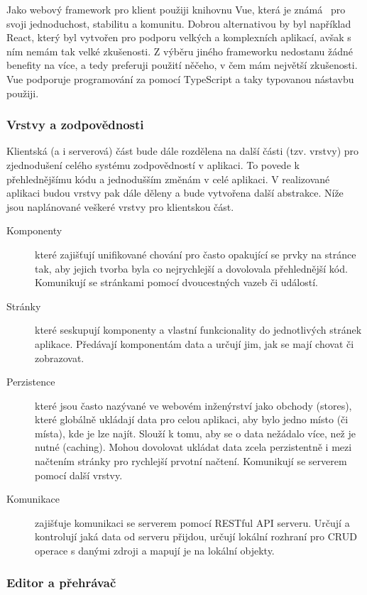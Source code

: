 Jako webový framework pro klient použiji knihovnu Vue, která je známá~\cite{potter_2023} pro svoji jednoduchost, stabilitu a komunitu.
Dobrou alternativou by byl například React, který byl vytvořen pro podporu velkých a komplexních aplikací, avšak s ním nemám tak velké zkušenosti.
Z výběru jiného frameworku nedostanu žádné benefity na více, a tedy preferuji použití něčeho, v čem mám největší zkušenosti.
Vue podporuje programování za pomocí TypeScript a taky typovanou nástavbu použiji.

\subsubsection{Vrstvy a zodpovědnosti}

Klientská (a i serverová) část bude dále rozdělena na další části (tzv. vrstvy) pro zjednodušení celého systému zodpovědností v aplikaci.
To povede k přehlednějšímu kódu a jednodušším změnám v celé aplikaci.
V realizované aplikaci budou vrstvy pak dále děleny a bude vytvořena další abstrakce.
Níže jsou naplánované veškeré vrstvy pro klientskou část.

\begin{description}
    \item[Komponenty] které zajišťují unifikované chování pro často opakující se prvky na stránce tak, aby jejich tvorba byla co nejrychlejší a dovolovala přehlednější kód. Komunikují se stránkami pomocí dvoucestných vazeb či událostí.
    \item[Stránky] které seskupují komponenty a vlastní funkcionality do jednotlivých stránek aplikace. Předávají komponentám data a určují jim, jak se mají chovat či zobrazovat.
    \item[Perzistence] které jsou často nazývané ve webovém inženýrství jako obchody (stores), které globálně ukládají data pro celou aplikaci, aby bylo jedno místo (či místa), kde je lze najít. Slouží k tomu, aby se o data nežádalo více, než je nutné (caching). Mohou dovolovat ukládat data zcela perzistentně i mezi načtením stránky pro rychlejší prvotní načtení. Komunikují se serverem pomocí další vrstvy.
    \item[Komunikace] zajišťuje komunikaci se serverem pomocí RESTful API serveru. Určují a kontrolují jaká data od serveru přijdou, určují lokální rozhraní pro CRUD operace s danými zdroji a mapují je na lokální objekty.
\end{description}

\subsubsection{Editor a přehrávač}

